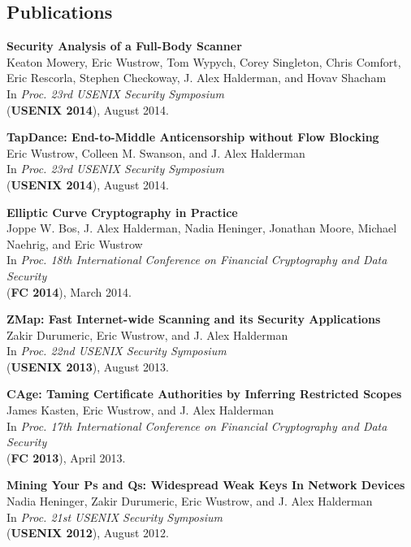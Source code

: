 \documentclass{res}
\begin{document}
\begin{resume}
\section{Publications}

    \textbf{Security Analysis of a Full-Body Scanner} \\
    Keaton Mowery, Eric Wustrow, Tom Wypych, Corey Singleton, Chris Comfort, Eric Rescorla, Stephen Checkoway, J. Alex Halderman, and Hovav Shacham \\
    In \emph{Proc. 23rd USENIX Security Symposium} \\
    (\textbf{USENIX 2014}), August 2014.

    \textbf{TapDance: End-to-Middle Anticensorship without Flow Blocking} \\
    Eric Wustrow, Colleen M. Swanson, and J. Alex Halderman \\
    In \emph{Proc. 23rd USENIX Security Symposium} \\
    (\textbf{USENIX 2014}), August 2014.

    \textbf{Elliptic Curve Cryptography in Practice} \\
    Joppe W. Bos, J. Alex Halderman, Nadia Heninger, Jonathan Moore, Michael Naehrig, and Eric Wustrow \\
    In \emph{Proc. 18th International Conference on Financial Cryptography and Data Security} \\
    (\textbf{FC 2014}), March 2014.

    \textbf{ZMap: Fast Internet-wide Scanning and its Security Applications} \\
    Zakir Durumeric, Eric Wustrow, and J. Alex Halderman \\
    In \emph{Proc. 22nd USENIX Security Symposium} \\
    (\textbf{USENIX 2013}), August 2013.

    \textbf{CAge: Taming Certificate Authorities by Inferring Restricted Scopes} \\
    James Kasten, Eric Wustrow, and J. Alex Halderman \\
    In \emph{Proc. 17th International Conference on Financial Cryptography and Data Security} \\
    (\textbf{FC 2013}), April 2013.

    \textbf{Mining Your Ps and Qs: Widespread Weak Keys In Network Devices} \\
    Nadia Heninger, Zakir Durumeric, Eric Wustrow, and J. Alex Halderman \\
    In \emph{Proc. 21st USENIX Security Symposium} \\
    (\textbf{USENIX 2012}), August 2012.


\end{resume}
\end{document}
